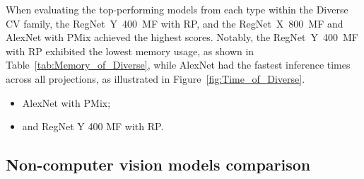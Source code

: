 When evaluating the top-performing models from each type within the Diverse \gls{CV} family, the \mbox{RegNet Y 400 MF} with \gls{RP}, and the \mbox{RegNet X 800 MF} and AlexNet with \gls{PMix} achieved the highest scores. Notably, the \mbox{RegNet Y 400 MF} with \gls{RP} exhibited the lowest memory usage, as shown in Table~\ref{tab:Memory_of_Diverse}, while AlexNet had the fastest inference times across all projections, as illustrated in Figure~\ref{fig:Time_of_Diverse}.  
\begin{itemize}
	\item AlexNet with \gls{PMix};
	\item and RegNet Y 400 MF with \gls{RP}.
\end{itemize}






\FloatBarrier

\subsection{Non-computer vision models comparison}


